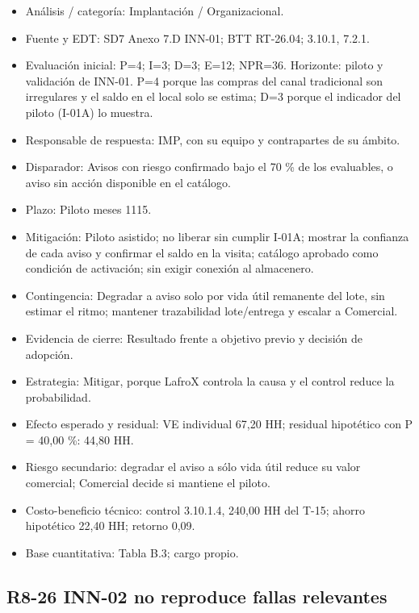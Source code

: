 \begin{itemize}[leftmargin=*,itemsep=3pt]
\item Análisis / categoría: Implantación / Organizacional.
\item Fuente y EDT: SD7 Anexo 7.D INN-01; BTT RT-26.04; 3.10.1, 7.2.1.
\item Evaluación inicial: P=4; I=3; D=3; E=12; NPR=36. Horizonte: piloto y validación de INN-01. P=4 porque las compras del canal tradicional son irregulares y el saldo en el local solo se estima; D=3 porque el indicador del piloto (I-01A) lo muestra.
\item Responsable de respuesta: IMP, con su equipo y contrapartes de su ámbito.
\item Disparador: Avisos con riesgo confirmado bajo el 70 \% de los evaluables, o aviso sin acción disponible en el catálogo.
\item Plazo: Piloto meses 11\textendash{}15.
\item Mitigación: Piloto asistido; no liberar sin cumplir I-01A; mostrar la confianza de cada aviso y confirmar el saldo en la visita; catálogo aprobado como condición de activación; sin exigir conexión al almacenero.
\item Contingencia: Degradar a aviso solo por vida útil remanente del lote, sin estimar el ritmo; mantener trazabilidad lote/entrega y escalar a Comercial.
\item Evidencia de cierre: Resultado frente a objetivo previo y decisión de adopción.
\item Estrategia: Mitigar, porque LafroX controla la causa y el control reduce la probabilidad.
\item Efecto esperado y residual: VE individual 67,20 HH; residual hipotético con P = 40,00 \%: 44,80 HH.
\item Riesgo secundario: degradar el aviso a sólo vida útil reduce su valor comercial; Comercial decide si mantiene el piloto.
\item Costo-beneficio técnico: control 3.10.1.4, 240,00 HH del T-15; ahorro hipotético 22,40 HH; retorno 0,09.
\item Base cuantitativa: Tabla B.3; cargo propio.
\end{itemize}

\subsection*{R8-26 \textemdash{} INN-02 no reproduce fallas relevantes}

